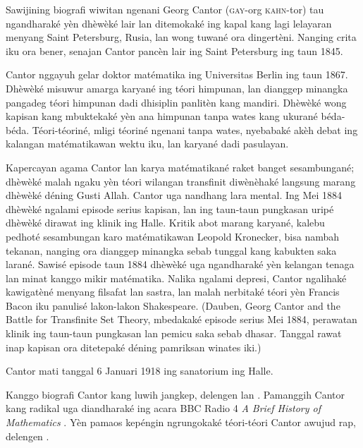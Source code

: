 \documentclass[../../../include/open-logic-section]{subfiles}
\begin{document}



Sawijining biografi wiwitan ngenani Georg Cantor (\textsc{gay}-org
\textsc{kahn}-tor) tau ngandharaké yèn dhèwèké lair lan ditemokaké
ing kapal kang lagi lelayaran menyang Saint Petersburg, Rusia,
lan wong tuwané ora dingertèni. Nanging crita iku ora bener,
senajan Cantor pancèn lair ing Saint Petersburg ing taun 1845.

Cantor nggayuh gelar doktor matématika ing Universitas Berlin
ing taun 1867. Dhèwèké misuwur amarga karyané ing téori
himpunan, lan dianggep minangka pangadeg téori himpunan
dadi dhisiplin panlitèn kang mandiri.
Dhèwèké wong kapisan kang mbuktekaké yèn ana himpunan
tanpa wates kang ukurané béda-béda.
Téori-téoriné, mligi téoriné ngenani tanpa wates,
nyebabaké akèh debat ing kalangan matématikawan
wektu iku, lan karyané dadi pasulayan.

Kapercayan agama Cantor lan karya matématikané raket banget
sesambungané; dhèwèké malah ngaku yèn téori wilangan
transfinit diwènèhaké langsung marang dhèwèké déning
Gusti Allah. Cantor uga nandhang
lara mental. Ing Mei 1884 dhèwèké ngalami episode serius
kapisan, lan ing taun-taun pungkasan uripé dhèwèké
dirawat ing klinik ing Halle. Kritik abot marang karyané,
kalebu pedhoté sesambungan karo matématikawan Leopold
Kronecker, bisa nambah tekanan, nanging ora dianggep
minangka sebab tunggal kang kabukten saka larané.
Sawisé episode taun 1884 dhèwèké uga ngandharaké yèn
kelangan tenaga lan minat kanggo mikir matématika. Nalika ngalami depresi, Cantor ngalihaké
kawigatèné menyang filsafat lan sastra, lan malah
nerbitaké téori yèn Francis Bacon iku panulisé
lakon-lakon Shakespeare.
(Dauben, Georg Cantor and the Battle for Transfinite Set Theory, mbedakaké episode serius Mei 1884, perawatan klinik ing taun-taun pungkasan lan pemicu saka sebab dhasar. Tanggal rawat inap kapisan ora ditetepaké déning pamriksan winates iki.)

Cantor mati tanggal 6 Januari 1918 ing sanatorium
ing Halle.

\begin{reading}
Kanggo biografi Cantor kang luwih jangkep, delengen
\citet{Dauben1990} lan \citet{Grattan-Guinness1971}.
Pamanggih Cantor kang radikal uga diandharaké ing acara
BBC Radio 4 \emph{A Brief History of
  Mathematics} \citep{Sautoy2014}. Yèn pamaos
kepéngin ngrungokaké téori-téori Cantor awujud rap,
delengen \citet{Rose2012}.
\end{reading}
\end{document}
